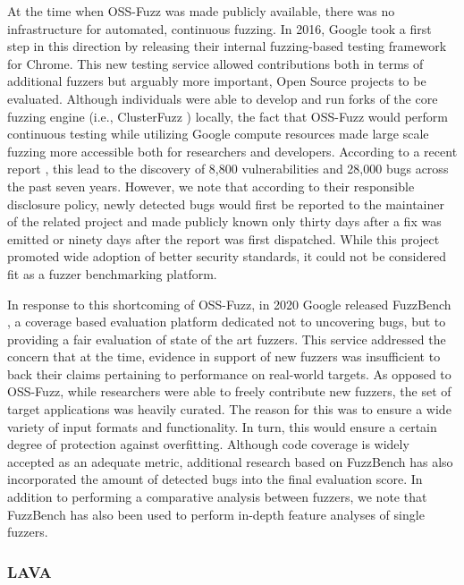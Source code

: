 At the time when OSS-Fuzz \cite{serebryany2017oss} was made publicly available, there was no infrastructure for automated, continuous fuzzing. In 2016, Google took a first step in this direction by releasing their internal fuzzing-based testing framework for Chrome. This new testing service allowed contributions both in terms of additional fuzzers but arguably more important, Open Source projects to be evaluated. Although individuals were able to develop and run forks of the core fuzzing engine (i.e., ClusterFuzz \cite{clusterfuzz}) locally, the fact that OSS-Fuzz would perform continuous testing while utilizing Google compute resources made large scale fuzzing more accessible both for researchers and developers. According to a recent report \cite{chang_2023}, this lead to the discovery of 8,800 vulnerabilities and 28,000 bugs across the past seven years. However, we note that according to their responsible disclosure policy, newly detected bugs would first be reported to the maintainer of the related project and made publicly known only thirty days after a fix was emitted or ninety days after the report was first dispatched. While this project promoted wide adoption of better security standards, it could not be considered fit as a fuzzer benchmarking platform.

In response to this shortcoming of OSS-Fuzz, in 2020 Google released FuzzBench \cite{fuzzbench,metzman2021fuzzbench}, a coverage based evaluation platform dedicated not to uncovering bugs, but to providing a fair evaluation of state of the art fuzzers. This service addressed the concern that at the time, evidence in support of new fuzzers was insufficient \cite{klees2018evaluating} to back their claims pertaining to performance on real-world targets. As opposed to OSS-Fuzz, while researchers were able to freely contribute new fuzzers, the set of target applications was heavily curated. The reason for this was to ensure a wide variety of input formats and functionality. In turn, this would ensure a certain degree of protection against overfitting. Although code coverage is widely accepted as an adequate metric, additional research \cite{asprone2022comparing} based on FuzzBench has also incorporated the amount of detected bugs into the final evaluation score. In addition to performing a comparative analysis between fuzzers, we note that FuzzBench has also been used to perform in-depth feature analyses \cite{fioraldi2023dissecting} of single fuzzers.

\subsubsection{LAVA}
\label{extend:netfuzz:benchmarks:lava}

